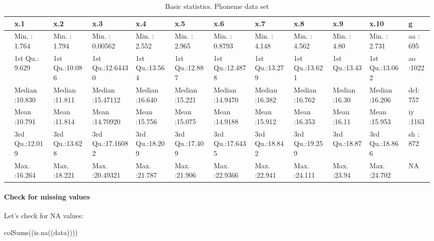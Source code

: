\documentclass[
]{article}
\newenvironment{Shaded}{\begin{snugshade}}{\end{snugshade}}
\newcommand{\FunctionTok}[1]{\textcolor[rgb]{0.00,0.00,0.00}{#1}}
\newcommand{\NormalTok}[1]{#1}
\begin{document}
\begin{table}

\caption{\label{tab:unnamed-chunk-12}Basic statistics. Phoneme data set}
\centering
\begin{tabular}[t]{l|l|l|l|l|l|l|l|l|l|l|l}
\hline
  &      x.1 &      x.2 &      x.3 &      x.4 &      x.5 &      x.6 &      x.7 &      x.8 &      x.9 &      x.10 &   g\\
\hline
 & Min.   : 1.764 & Min.   : 1.794 & Min.   : 0.00562 & Min.   : 2.552 & Min.   : 2.965 & Min.   : 0.8793 & Min.   : 4.148 & Min.   : 4.562 & Min.   : 4.80 & Min.   : 2.731 & aa : 695\\
\hline
 & 1st Qu.: 9.629 & 1st Qu.:10.086 & 1st Qu.:12.64430 & 1st Qu.:13.564 & 1st Qu.:12.887 & 1st Qu.:12.4878 & 1st Qu.:13.279 & 1st Qu.:13.621 & 1st Qu.:13.43 & 1st Qu.:13.062 & ao :1022\\
\hline
 & Median :10.830 & Median :11.811 & Median :15.47112 & Median :16.640 & Median :15.221 & Median :14.9470 & Median :16.382 & Median :16.762 & Median :16.30 & Median :16.206 & dcl: 757\\
\hline
 & Mean   :10.791 & Mean   :11.814 & Mean   :14.70920 & Mean   :15.756 & Mean   :15.075 & Mean   :14.9188 & Mean   :15.912 & Mean   :16.353 & Mean   :16.11 & Mean   :15.953 & iy :1163\\
\hline
 & 3rd Qu.:12.019 & 3rd Qu.:13.628 & 3rd Qu.:17.16082 & 3rd Qu.:18.209 & 3rd Qu.:17.409 & 3rd Qu.:17.6435 & 3rd Qu.:18.842 & 3rd Qu.:19.259 & 3rd Qu.:18.87 & 3rd Qu.:18.866 & sh : 872\\
\hline
 & Max.   :16.264 & Max.   :18.221 & Max.   :20.49321 & Max.   :21.787 & Max.   :21.906 & Max.   :22.9366 & Max.   :22.941 & Max.   :24.111 & Max.   :23.94 & Max.   :24.702 & NA\\
\hline
\end{tabular}
\end{table}

\hypertarget{check-for-missing-values}{%
\paragraph{Check for missing values}\label{check-for-missing-values}}

Let's check for NA values:

\begin{Shaded}
\begin{Highlighting}[]
\FunctionTok{colSums}\NormalTok{((}\FunctionTok{is.na}\NormalTok{((data))))}
\end{Highlighting}
\end{Shaded}
\end{document}

